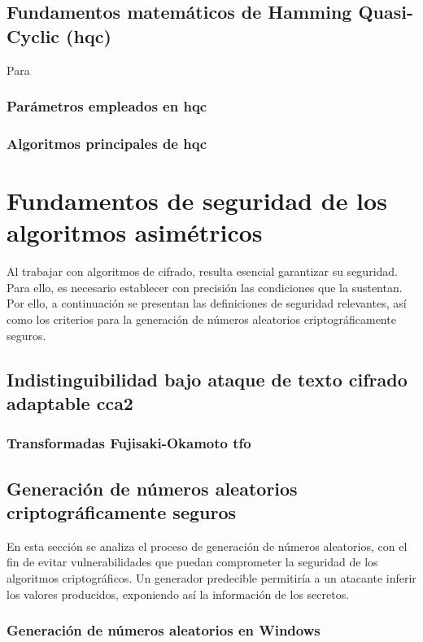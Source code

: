 \subsection{Fundamentos matemáticos de Hamming Quasi-Cyclic (\gls{hqc})}
Para  \cite{hqc-spec-2022}
\subsubsection{Parámetros empleados en \gls{hqc}}
\subsubsection{Algoritmos principales de \gls{hqc} \cite{hqc-spec-2022}}
\newpage
\section{Fundamentos de seguridad de los algoritmos asimétricos}
Al trabajar con algoritmos de cifrado, resulta esencial garantizar su seguridad. Para ello, es necesario establecer con precisión las condiciones que la sustentan. Por ello, a continuación se presentan las definiciones de seguridad relevantes, así como los criterios para la generación de números aleatorios criptográficamente seguros.

\subsection{Indistinguibilidad bajo ataque de texto cifrado adaptable \gls{cca2}}
\cite{CCA2}
\subsubsection{Transformadas Fujisaki-Okamoto \gls{tfo}}
\cite{Fujisaki1999}

\subsection{Generación de números aleatorios criptográficamente seguros}
En esta sección se analiza el proceso de generación de números aleatorios, con el fin de evitar vulnerabilidades que puedan comprometer la seguridad de los algoritmos criptográficos. Un generador predecible permitiría a un atacante inferir los valores producidos, exponiendo así la información de los secretos.
\subsubsection{Generación de números aleatorios en Windows}
\cite{rngWIN}
